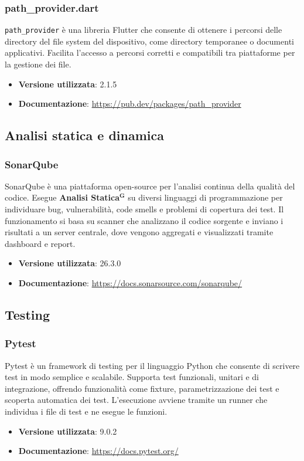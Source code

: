\documentclass[a4paper,12pt]{article}
\newcommand{\term}[1]{\textbf{#1}$^\mathbf{G}$}
\begin{document}
\subsubsection{path\_provider.dart}
\texttt{path\_provider} è una libreria Flutter che consente di ottenere i percorsi delle directory del file system del dispositivo, come directory temporanee o documenti applicativi. Facilita l’accesso a percorsi corretti e compatibili tra piattaforme per la gestione dei file.
\begin{itemize}
    \item \textbf{Versione utilizzata}: 2.1.5
    \item \textbf{Documentazione}: \url{https://pub.dev/packages/path_provider}
\end{itemize}

\subsection{Analisi statica e dinamica} \label{subsec:analisi_statica_dinamica}

\subsubsection{SonarQube}
SonarQube è una piattaforma open-source per l’analisi continua della qualità del codice. Esegue \term{Analisi Statica} su diversi linguaggi di programmazione per individuare bug, vulnerabilità, code smells e problemi di copertura dei test. Il funzionamento si basa su scanner che analizzano il codice sorgente e inviano i risultati a un server centrale, dove vengono aggregati e visualizzati tramite dashboard e report.
\begin{itemize}
    \item \textbf{Versione utilizzata}: 26.3.0
    \item \textbf{Documentazione}: \url{https://docs.sonarsource.com/sonarqube/}
\end{itemize}

\subsection{Testing} \label{subsec:testing}

\subsubsection{Pytest}
Pytest è un framework di testing per il linguaggio Python che consente di scrivere test in modo semplice e scalabile. Supporta test funzionali, unitari e di integrazione, offrendo funzionalità come fixture, parametrizzazione dei test e scoperta automatica dei test. L’esecuzione avviene tramite un runner che individua i file di test e ne esegue le funzioni.
\begin{itemize}
    \item \textbf{Versione utilizzata}: 9.0.2
    \item \textbf{Documentazione}: \url{https://docs.pytest.org/}
\end{itemize}
\end{document}
